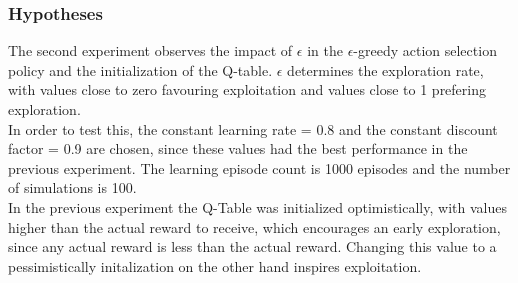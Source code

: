 \documentclass[11pt]{article}
\begin{document}
\subsubsection{Hypotheses}
The second experiment observes the impact of $\epsilon$ in the $\epsilon$-greedy action selection policy and the initialization of the Q-table. $\epsilon$ determines the exploration rate, with values close to zero favouring exploitation and values close to 1 prefering exploration.\\
In order to test this, the constant learning rate = 0.8 and the constant discount factor = 0.9 are chosen, since these values had the best performance in the previous experiment. The learning episode count is 1000 episodes and the number of simulations is 100.\\
In the previous experiment the Q-Table was initialized optimistically, with values higher than the actual reward to receive, which encourages an early exploration, since any actual reward is less than the actual reward. Changing this value to a pessimistically initalization on the other hand inspires exploitation.
\end{document}
